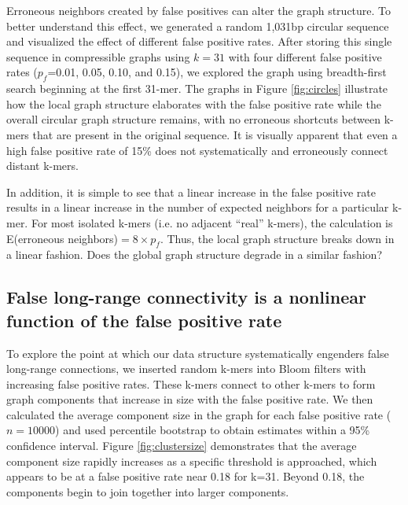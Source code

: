\documentclass{pnastwo}
\begin{document}
\begin{article}
Erroneous neighbors created by false positives can alter the graph
structure.  To better understand this effect, we generated a random
1,031bp circular sequence and visualized the effect of different false
positive rates.  After storing this single sequence in compressible
graphs using $k=31$ with four different false positive rates
($p_f$=0.01, 0.05, 0.10, and 0.15), we explored the graph using
breadth-first search beginning at the first 31-mer.  The graphs in
Figure \ref{fig:circles} illustrate how the local graph structure elaborates with the
false positive rate while the overall circular graph structure
remains, with no erroneous shortcuts between k-mers that are present
in the original sequence.  It is visually apparent that even a high false positive rate of 15\% does not systematically and erroneously connect distant k-mers.

In addition, it is simple to see that a linear increase in the false 
positive rate results in a linear increase in the number of expected 
neighbors for a particular k-mer. For most isolated k-mers (i.e. no adjacent 
``real'' k-mers), the calculation is 
E(erroneous neighbors)$ = 8 \times p_f$. Thus, the local graph 
structure breaks down in a linear fashion.  Does the global graph structure
degrade in a similar fashion?

\subsection{False long-range connectivity is a nonlinear function of the false positive rate}

To explore the point at which our data structure systematically
engenders false long-range connections, we inserted random k-mers
into Bloom filters with increasing false positive rates.  These k-mers
connect to other k-mers to form graph components that increase
in size with the false positive rate.
We then
calculated the average component size in the graph for each false positive rate
($n=10000$) and used percentile bootstrap to obtain estimates within a
95\% confidence interval. Figure \ref{fig:clustersize} demonstrates that the average component size
rapidly increases as a specific threshold is approached, which appears
to be at a false positive rate near 0.18 for k=31. Beyond 0.18, the components
begin to join together into larger components.


\end{article}
\end{document}

